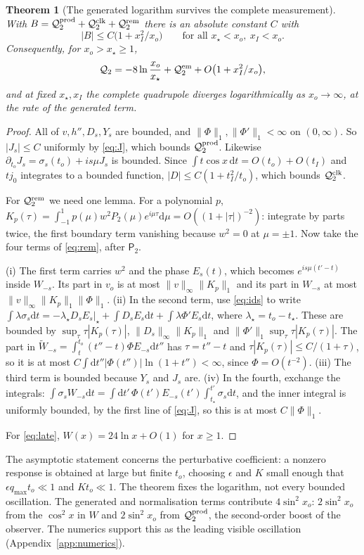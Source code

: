 \documentclass[10pt]{article}
\newtheorem{theorem}{Theorem}
\newcommand{\eps}{\epsilon}
\newcommand{\dd}{\mathrm{d}}
\newcommand{\Q}{\mathcal Q_2}
\begin{document}
\begin{theorem}[The generated logarithm survives the complete measurement]\label{thm:Q}
With $B=\Q^{\rm prod}+\Q^{\rm clk}+\Q^{\rm rem}$ there is an absolute constant $C$ with
\begin{equation}
|B|\le C\big(1+x_I^2/x_o\big)\qquad\text{for all }x_\star<x_o,\ x_I<x_o.
\end{equation}
Consequently, for $x_o>x_\star\ge1$,
\begin{equation}\label{eq:late}
\Q=-8\ln\frac{x_o}{x_\star}+\Q^{\rm em}+O\big(1+x_I^2/x_o\big),
\end{equation}
and at fixed $x_\star,x_I$ the complete quadrupole diverges logarithmically as $x_o\to\infty$, at the rate of the generated term.
\end{theorem}
\begin{proof}
All of $v,h'',D_s,Y_s$ are bounded, and $\|\Phi\|_1,\|\Phi'\|_1<\infty$ on $(0,\infty)$. So $|J_s|\le C$ uniformly by \eqref{eq:J}, which bounds $\Q^{\rm prod}$. Likewise $\partial_{t_o}J_s=\sigma_s(t_o)+is\mu J_s$ is bounded. Since $\int t\cos x\,\dd t=O(t_o)+O(t_I)$ and $tj_0$ integrates to a bounded function, $|D|\le C(1+t_I^2/t_o)$, which bounds $\Q^{\rm clk}$.

For $\Q^{\rm rem}$ we need one lemma. For a polynomial $p$, $K_p(\tau)=\int_{-1}^1p(\mu)w^2P_2(\mu)e^{i\mu\tau}\dd\mu=O((1+|\tau|)^{-2})$: integrate by parts twice, the first boundary term vanishing because $w^2=0$ at $\mu=\pm1$. Now take the four terms of \eqref{eq:rem}, after $\mathsf P_2$.

(i) The first term carries $w^2$ and the phase $E_s(t)$, which becomes $e^{is\mu(t'-t)}$ inside $W_{-s}$. Its part in $v_o$ is at most $\|v\|_\infty\|K_p\|_1$ and its part in $W_{-s}$ at most $\|v\|_\infty\|K_p\|_1\|\Phi\|_1$. (ii) In the second term, use \eqref{eq:ids} to write $\int\lambda\sigma_s\dd t=-\lambda_\star D_sE_s|_\star+\int D_sE_s\dd t+\int\lambda\Phi'E_s\dd t$, where $\lambda_\star=t_o-t_\star$. These are bounded by $\sup_\tau\tau|K_p(\tau)|$, $\|D_s\|_\infty\|K_p\|_1$ and $\|\Phi'\|_1\sup_\tau\tau|K_p(\tau)|$. The part in $\widetilde W_{-s}=\int_t^{t_o}(t''-t)\Phi E_{-s}\dd t''$ has $\tau=t''-t$ and $\tau|K_p(\tau)|\le C/(1+\tau)$, so it is at most $C\int\dd t''|\Phi(t'')|\ln(1+t'')<\infty$, since $\Phi=O(t^{-2})$. (iii) The third term is bounded because $Y_s$ and $J_s$ are. (iv) In the fourth, exchange the integrals: $\int\sigma_sW_{-s}\dd t=\int\dd t'\,\Phi(t')E_{-s}(t')\int_{t_\star}^{t'}\sigma_s\dd t$, and the inner integral is uniformly bounded, by the first line of \eqref{eq:J}, so this is at most $C\|\Phi\|_1$.

For \eqref{eq:late}, $W(x)=24\ln x+O(1)$ for $x\ge1$.
\end{proof}
The asymptotic statement concerns the perturbative coefficient: a nonzero response is obtained at large but finite $t_o$, choosing $\eps$ and $K$ small enough that $\eps q_{\max}t_o\ll1$ and $Kt_o\ll1$. The theorem fixes the logarithm, not every bounded oscillation. The generated and normalisation terms contribute $4\sin^2x_o$: $2\sin^2x_o$ from the $\cos^2x$ in $W$ and $2\sin^2x_o$ from $\Q^{\rm prod}$, the second-order boost of the observer. The numerics support this as the leading visible oscillation (Appendix~\ref{app:numerics}).
\end{document}
